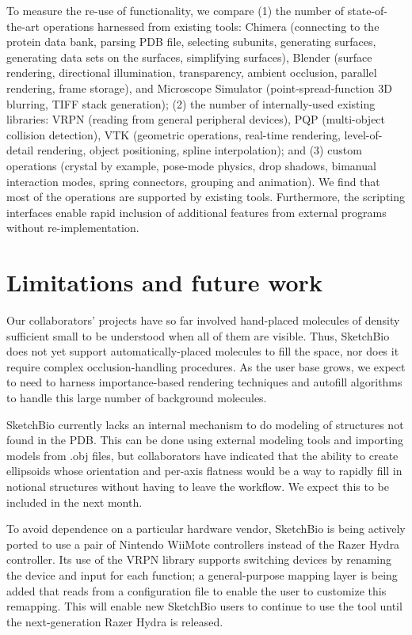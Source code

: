 \documentclass[twocolumn]{bmcart}%
\begin{document}
To measure the re-use of functionality, we compare (1) the number of state-of-the-art operations harnessed from existing tools: Chimera (connecting to the protein data bank, parsing PDB file, selecting subunits, generating surfaces, generating data sets on the surfaces, simplifying surfaces), Blender (surface rendering, directional illumination, transparency, ambient occlusion, parallel rendering, frame storage), and Microscope Simulator (point-spread-function 3D blurring, TIFF stack generation); (2) the number of internally-used existing libraries: VRPN (reading from general peripheral devices), PQP (multi-object collision detection), VTK (geometric operations, real-time rendering, level-of-detail rendering, object positioning, spline interpolation); and (3) custom operations (crystal by example, pose-mode physics, drop shadows, bimanual interaction modes, spring connectors, grouping and animation).  We find that most of the operations are supported by existing tools.  Furthermore, the scripting interfaces enable rapid inclusion of additional features from external programs without re-implementation.


\section*{Limitations and future work}
Our collaborators' projects have so far involved hand-placed molecules of density sufficient small to be understood when all of them are visible.  Thus, SketchBio does not yet support automatically-placed molecules to fill the space, nor does it require complex occlusion-handling procedures.  As the user base grows, we expect to need to harness importance-based rendering techniques and autofill algorithms to handle this large number of background molecules.

SketchBio currently lacks an internal mechanism to do modeling of structures not found in the PDB.  This can be done using external modeling tools and importing models from .obj files, but collaborators have indicated that the ability to create ellipsoids whose orientation and per-axis flatness would be a way to rapidly fill in notional structures without having to leave the workflow.  We expect this to be included in the next month.

To avoid dependence on a particular hardware vendor, SketchBio is being actively ported to use a pair of Nintendo WiiMote controllers instead of the Razer Hydra controller.  Its use of the VRPN library supports switching devices by renaming the device and input for each function; a general-purpose mapping layer is being added that reads from a configuration file to enable the user to customize this remapping.  This will enable new SketchBio users to continue to use the tool until the next-generation Razer Hydra is released.
\end{document}
